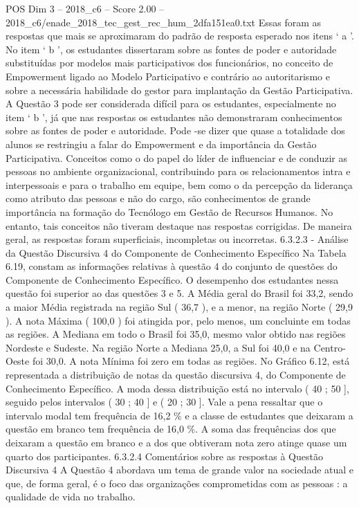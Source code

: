 \begin{textsample}{POS Dim 3 – 2018\_c6 – Score 2.00 – 2018\_c6/enade\_2018\_tec\_gest\_rec\_hum\_2dfa151ea0.txt}
Essas foram as respostas que mais se aproximaram do padrão de resposta esperado nos itens ‘ a ’.
No item ‘ b ’, os estudantes dissertaram sobre as fontes de poder e autoridade substituídas por modelos mais participativos dos funcionários, no conceito de Empowerment ligado ao Modelo Participativo e contrário ao autoritarismo e sobre a necessária habilidade do gestor para implantação da Gestão Participativa.
A Questão 3 pode ser considerada difícil para os estudantes, especialmente no item ‘ b ’, já que nas respostas os estudantes não demonstraram conhecimentos sobre as fontes de poder e autoridade.
Pode -se dizer que quase a totalidade dos alunos se restringiu a falar do Empowerment e da importância da Gestão Participativa.
Conceitos como o do papel do líder de influenciar e de conduzir as pessoas no ambiente organizacional, contribuindo para os relacionamentos intra e interpessoais e para o trabalho em equipe, bem como o da percepção da liderança como atributo das pessoas e não do cargo, são conhecimentos de grande importância na formação do Tecnólogo em Gestão de Recursos Humanos.
No entanto, tais conceitos não tiveram destaque nas respostas corrigidas.
De maneira geral, as respostas foram superficiais, incompletas ou incorretas. 6.3.2.3 - Análise da Questão Discursiva 4 do Componente de Conhecimento Específico Na Tabela 6.19, constam as informações relativas à questão 4 do conjunto de questões do Componente de Conhecimento Específico.
O desempenho dos estudantes nessa questão foi superior ao das questões 3 e 5.
A Média geral do Brasil foi 33,2, sendo a maior Média registrada na região Sul ( 36,7 ), e a menor, na região Norte ( 29,9 ).
A nota Máxima ( 100,0 ) foi atingida por, pelo menos, um concluinte em todas as regiões.
A Mediana em todo o Brasil foi 35,0, mesmo valor obtido nas regiões Nordeste e Sudeste.
Na região Norte a Mediana 25,0, a Sul foi 40,0 e na Centro-Oeste foi 30,0.
A nota Mínima foi zero em todas as regiões.
No Gráfico 6.12, está representada a distribuição de notas da questão discursiva 4, do Componente de Conhecimento Específico.
A moda dessa distribuição está no intervalo ( 40 ; 50 ], seguido pelos intervalos ( 30 ; 40 ] e ( 20 ; 30 ].
Vale a pena ressaltar que o intervalo modal tem frequência de 16,2 \% e a classe de estudantes que deixaram a questão em branco tem frequência de 16,0 \%.
A soma das frequências dos que deixaram a questão em branco e a dos que obtiveram nota zero atinge quase um quarto dos participantes. 6.3.2.4 Comentários sobre as respostas à Questão Discursiva 4 A Questão 4 abordava um tema de grande valor na sociedade atual e que, de forma geral, é o foco das organizações comprometidas com as pessoas : a qualidade de vida no trabalho.

\end{textsample}
